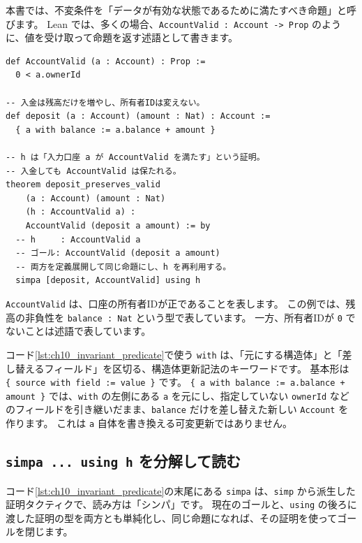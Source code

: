 本書では、不変条件を「データが有効な状態であるために満たすべき命題」と呼びます。
Lean では、多くの場合、\texttt{AccountValid : Account -> Prop} のように、値を受け取って命題を返す述語として書きます。

\begin{listing}[htbp]
\begin{verbatim}
def AccountValid (a : Account) : Prop :=
  0 < a.ownerId

-- 入金は残高だけを増やし、所有者IDは変えない。
def deposit (a : Account) (amount : Nat) : Account :=
  { a with balance := a.balance + amount }

-- h は「入力口座 a が AccountValid を満たす」という証明。
-- 入金しても AccountValid は保たれる。
theorem deposit_preserves_valid
    (a : Account) (amount : Nat)
    (h : AccountValid a) :
    AccountValid (deposit a amount) := by
  -- h     : AccountValid a
  -- ゴール: AccountValid (deposit a amount)
  -- 両方を定義展開して同じ命題にし、h を再利用する。
  simpa [deposit, AccountValid] using h
\end{verbatim}
\caption{\texttt{AccountValid} と \texttt{deposit}}
\label{lst:ch10_invariant_predicate}
\end{listing}

\texttt{AccountValid} は、口座の所有者IDが正であることを表します。
この例では、残高の非負性を \texttt{balance : Nat} という型で表しています。
一方、所有者IDが \texttt{0} でないことは述語で表しています。

コード\ref{lst:ch10_invariant_predicate}で使う \texttt{with} は、「元にする構造体」と「差し替えるフィールド」を区切る、構造体更新記法のキーワードです。
基本形は \texttt{\{ source with field := value \}} です。
\texttt{\{ a with balance := a.balance + amount \}} では、\texttt{with} の左側にある \texttt{a} を元にし、指定していない \texttt{ownerId} などのフィールドを引き継いだまま、\texttt{balance} だけを差し替えた新しい \texttt{Account} を作ります。
これは \texttt{a} 自体を書き換える可変更新ではありません。

\subsection{\texttt{simpa ... using h} を分解して読む}

コード\ref{lst:ch10_invariant_predicate}の末尾にある \texttt{simpa} は、\texttt{simp} から派生した証明タクティクで、読み方は「シンパ」です。
現在のゴールと、\texttt{using} の後ろに渡した証明の型を両方とも単純化し、同じ命題になれば、その証明を使ってゴールを閉じます。

